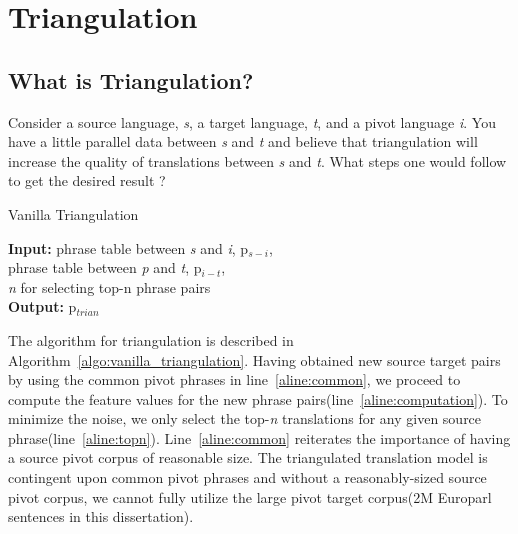 \chapter{Triangulation}
\label{chap:triangulation}


\section{What is Triangulation?}
\label{sec:triangulation}

Consider a source language, \emph{s}, a target language, \emph{t}, and a pivot language \emph{i}. You have a little parallel data between \emph{s} and \emph{t} and believe that triangulation will increase the quality of translations between \emph{s} and \emph{t}. What steps one would follow to get the desired result ?

\begin{algorithm}
\caption{Vanilla Triangulation}
\label{algo:vanilla_triangulation}

\textbf{Input:} phrase table between \emph{s} and \emph{i}, p$_{s-i}$, \\
 phrase table between \emph{p} and \emph{t}, p$_{i-t}$,  \\
 \emph{n} for selecting top-n phrase pairs \\
\textbf{Output:} p$_{trian}$
\begin{algorithmic}[l]
 \label{aline:common}

         \label{aline:computation}
        \ENDFOR
         \label{aline:topn}
        \ENDIF
        \ENDFOR


\end{algorithmic}

\end{algorithm}

The algorithm for triangulation is described in Algorithm~\ref{algo:vanilla_triangulation}. Having obtained new source target pairs by using the common pivot phrases in line~\ref{aline:common}, we proceed to compute the feature values for the new phrase pairs(line~\ref{aline:computation}). To minimize the noise, we only select the top-\emph{n} translations for any given source phrase(line~\ref{aline:topn}). Line~\ref{aline:common} reiterates the importance of having a source pivot corpus of reasonable size. The triangulated translation model is contingent upon common pivot phrases and without a reasonably-sized source pivot corpus, we cannot fully utilize the large pivot target corpus(2M Europarl sentences in this dissertation). 


